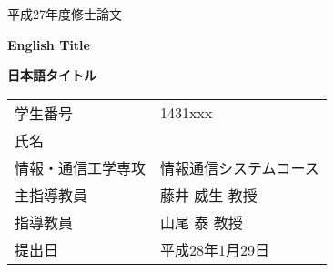 \documentclass[a4paper,11pt,openany]{book}
\begin{document}
\begin{center}
  \vspace*{20mm}

  {\LARGE 平成27年度修士論文\\}

  \vspace{10mm}

  {\Huge\bf English Title\\}

  \vspace{5mm}

  {\huge\bf 日本語タイトル\\}

  \vspace{10mm}

  \begin{table}[h]
    \LARGE
    \begin{center}
      \begin{tabular}{ll}
        学生番号 & 1431xxx\\
        氏名 & \\
        情報・通信工学専攻  & 情報通信システムコース\\
        主指導教員 & 藤井 威生 教授\\
        指導教員 & 山尾 泰 教授\\
        提出日 & 平成28年1月29日\\
      \end{tabular}
    \end{center}
  \end{table}
  
\end{center}
\end{document}
